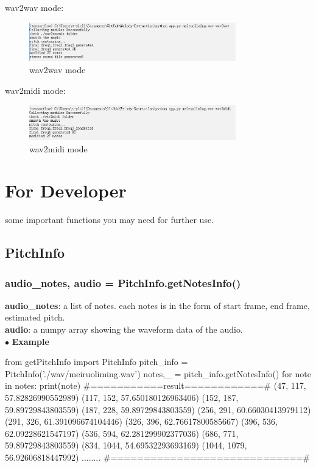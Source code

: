 \documentclass[twoside]{article}
\begin{document}
wav2wav mode:
\begin{figure}[H]
   \centering
   \includegraphics[width = 0.8\textwidth]{wav2wav.PNG}  
   \caption{wav2wav mode}
\end{figure}

wav2midi mode:
\begin{figure}[H]
   \centering
   \includegraphics[width = 0.8\textwidth]{wav2midi.PNG}  
   \caption{wav2midi mode}
\end{figure}

\section{For Developer}
some important functions you may need for further use.

\subsection{PitchInfo}
\subsubsection{audio\_notes, audio = PitchInfo.getNotesInfo()}
\textbf{audio\_notes}: a list of notes. each notes is in the form of start frame, end frame, estimated pitch.\\
\textbf{audio}: a numpy array showing the waveform data of the audio. \\

\noindent $\bullet$ \textbf{Example}
\begin{python}
from getPitchInfo import PitchInfo
pitch_info = PitchInfo('./wav/meiruoliming.wav')
notes,_ = pitch_info.getNotesInfo()
for note in notes:
	print(note)
#===========result============#
(47, 117, 57.82826990552989)
(117, 152, 57.650180126963406)
(152, 187, 59.89729843803559)
(187, 228, 59.89729843803559)
(256, 291, 60.66030413979112)
(291, 326, 61.391096674104446)
(326, 396, 62.76617800585667)
(396, 536, 62.09228621547197)
(536, 594, 62.281299902377036)
(686, 771, 59.89729843803559)
(834, 1044, 54.69532293693169)
(1044, 1079, 56.92606818447992)
........
#=============================#
\end{python}
\end{document}
